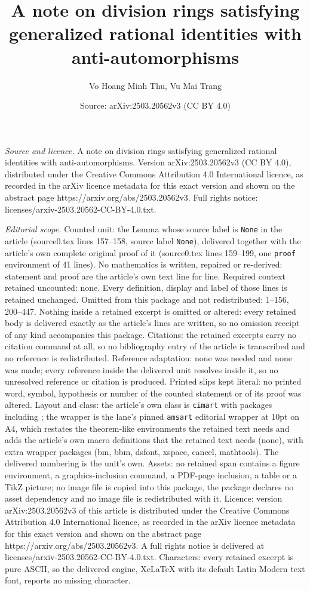 \documentclass[10pt,a4paper]{amsart}
\title[A note on division rings satisfying generalized rational ide]{A note on division rings satisfying generalized rational identities with anti-automorphisms}
\author{Vo Hoang Minh Thu, Vu Mai Trang}
\date{Source: arXiv:2503.20562v3 (CC BY 4.0)}
\begin{document}
\maketitle

\noindent\emph{Source and licence.} A note on division rings satisfying generalized rational identities with anti-automorphisms. Version arXiv:2503.20562v3 (CC BY 4.0), distributed under the Creative Commons Attribution 4.0 International licence, as recorded in the arXiv licence metadata for this exact version and shown on the abstract page https://arxiv.org/abs/2503.20562v3. Full rights notice: licenses/arxiv-2503.20562-CC-BY-4.0.txt.\par\smallskip

\noindent\textit{Editorial scope.} Counted unit: the Lemma whose source label is \texttt{None} in the article (source0.tex lines 157--158, source label \texttt{None}), delivered together with the article's own complete original proof of it (source0.tex lines 159--199, one \texttt{proof} environment of 41 lines). No mathematics is written, repaired or re-derived: statement and proof are the article's own text line for line. Required context retained uncounted: none. Every definition, display and label of those lines is retained unchanged. Omitted from this package and not redistributed: 1--156, 200--447. Nothing inside a retained excerpt is omitted or altered: every retained body is delivered exactly as the article's lines are written, so no omission receipt of any kind accompanies this package. Citations: the retained excerpts carry no citation command at all, so no bibliography entry of the article is transcribed and no reference is redistributed. Reference adaptation: none was needed and none was made; every reference inside the delivered unit resolves inside it, so no unresolved reference or citation is produced. Printed slips kept literal: no printed word, symbol, hypothesis or number of the counted statement or of its proof was altered. Layout and class: the article's own class is \texttt{cimart} with packages including ; the wrapper is the lane's pinned \texttt{amsart} editorial wrapper at 10pt on A4, which restates the theorem-like environments the retained text needs and adds the article's own macro definitions that the retained text needs (none), with extra wrapper packages (bm, bbm, dsfont, xspace, cancel, mathtools). The delivered numbering is the unit's own. Assets: no retained span contains a figure environment, a graphics-inclusion command, a PDF-page inclusion, a table or a TikZ picture; no image file is copied into this package, the package declares no asset dependency and no image file is redistributed with it. Licence: version arXiv:2503.20562v3 of this article is distributed under the Creative Commons Attribution 4.0 International licence, as recorded in the arXiv licence metadata for this exact version and shown on the abstract page https://arxiv.org/abs/2503.20562v3. A full rights notice is delivered at licenses/arxiv-2503.20562-CC-BY-4.0.txt. Characters: every retained excerpt is pure ASCII, so the delivered engine, XeLaTeX with its default Latin Modern text font, reports no missing character.
\end{document}
